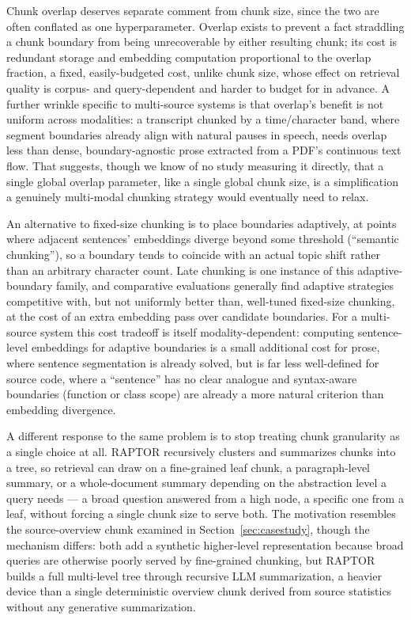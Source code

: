 \documentclass[conference]{IEEEtran}
\begin{document}
Chunk overlap deserves separate comment from chunk size, since the two are often conflated as one hyperparameter. Overlap exists to prevent a fact straddling a chunk boundary from being unrecoverable by either resulting chunk; its cost is redundant storage and embedding computation proportional to the overlap fraction, a fixed, easily-budgeted cost, unlike chunk size, whose effect on retrieval quality is corpus- and query-dependent and harder to budget for in advance. A further wrinkle specific to multi-source systems is that overlap's benefit is not uniform across modalities: a transcript chunked by a time/character band, where segment boundaries already align with natural pauses in speech, needs overlap less than dense, boundary-agnostic prose extracted from a PDF's continuous text flow. That suggests, though we know of no study measuring it directly, that a single global overlap parameter, like a single global chunk size, is a simplification a genuinely multi-modal chunking strategy would eventually need to relax.

An alternative to fixed-size chunking is to place boundaries adaptively, at points where adjacent sentences' embeddings diverge beyond some threshold (``semantic chunking''), so a boundary tends to coincide with an actual topic shift rather than an arbitrary character count. Late chunking \cite{gunther2024latechunking} is one instance of this adaptive-boundary family, and comparative evaluations \cite{merola2025chunking} generally find adaptive strategies competitive with, but not uniformly better than, well-tuned fixed-size chunking, at the cost of an extra embedding pass over candidate boundaries. For a multi-source system this cost tradeoff is itself modality-dependent: computing sentence-level embeddings for adaptive boundaries is a small additional cost for prose, where sentence segmentation is already solved, but is far less well-defined for source code, where a ``sentence'' has no clear analogue and syntax-aware boundaries (function or class scope) are already a more natural criterion than embedding divergence.

A different response to the same problem is to stop treating chunk granularity as a single choice at all. RAPTOR \cite{sarthi2024raptor} recursively clusters and summarizes chunks into a tree, so retrieval can draw on a fine-grained leaf chunk, a paragraph-level summary, or a whole-document summary depending on the abstraction level a query needs — a broad question answered from a high node, a specific one from a leaf, without forcing a single chunk size to serve both. The motivation resembles the source-overview chunk examined in Section~\ref{sec:casestudy}, though the mechanism differs: both add a synthetic higher-level representation because broad queries are otherwise poorly served by fine-grained chunking, but RAPTOR builds a full multi-level tree through recursive LLM summarization, a heavier device than a single deterministic overview chunk derived from source statistics without any generative summarization.
\end{document}
